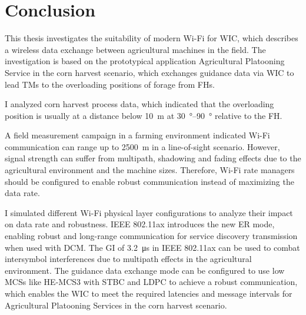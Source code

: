 \chapter{Conclusion}
\acresetall
\begin{comment}
    \begin{itemize}
    \item summarize again what your paper did, but now emphasize more the results, and comparisons
    \item write conclusions that can be drawn from the results found and the discussion presented in the paper
    \item future work (be very brief, explain what, but not much how, do not speculate about results or impact)
    \item recommended length: one page.
    \end{itemize}
\end{comment}
This thesis investigates the suitability of modern Wi-Fi for \ac{WIC}, which describes a wireless data exchange between agricultural machines in the field.
The investigation is based on the prototypical application Agricultural Platooning Service in the corn harvest scenario, which exchanges guidance data via \ac{WIC} to lead \acp{TM} to the overloading positions of forage from \acp{FH}.

I analyzed corn harvest process data, which indicated that the overloading position is usually at a distance below \SI{10}{\metre} at \SIrange{30}{90}{\degree} relative to the \ac{FH}.

A field measurement campaign in a farming environment indicated Wi-Fi communication can range up to \SI{2500}{\metre} in a line-of-sight scenario.
However, signal strength can suffer from multipath, shadowing and fading effects due to the agricultural environment and the machine sizes.
Therefore, Wi-Fi rate managers should be configured to enable robust communication instead of maximizing the data rate.

I simulated different Wi-Fi physical layer configurations to analyze their impact on data rate and robustness.
IEEE 802.11ax introduces the new \ac{ER} mode, enabling robust and long-range communication for service discovery transmission when used with \ac{DCM}.
The \ac{GI} of \SI{3.2}{\micro\second} in IEEE 802.11ax can be used to combat intersymbol interferences due to multipath effects in the agricultural environment.
The guidance data exchange mode can be configured to use low \acp{MCS} like \ac{HE}-\ac{MCS}3 with \ac{STBC} and \ac{LDPC} to achieve a robust communication,
which enables the \ac{WIC} to meet the required latencies and message intervals for Agricultural Platooning Services in the corn harvest scenario.

